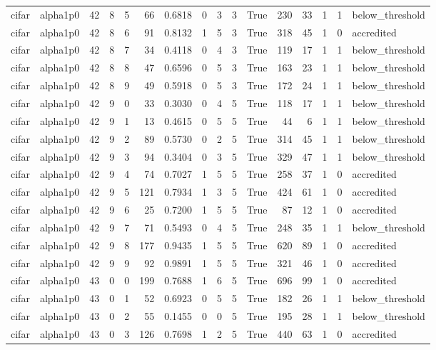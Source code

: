 \begin{tabular}{llrrrrrrrrrrrrrl}
cifar & alpha1p0 & 42 & 8 & 5 & 66 & 0.6818 & 0 & 3 & 3 & True & 230 & 33 & 1 & 1 & below\_threshold \\
cifar & alpha1p0 & 42 & 8 & 6 & 91 & 0.8132 & 1 & 5 & 3 & True & 318 & 45 & 1 & 0 & accredited \\
cifar & alpha1p0 & 42 & 8 & 7 & 34 & 0.4118 & 0 & 4 & 3 & True & 119 & 17 & 1 & 1 & below\_threshold \\
cifar & alpha1p0 & 42 & 8 & 8 & 47 & 0.6596 & 0 & 5 & 3 & True & 163 & 23 & 1 & 1 & below\_threshold \\
cifar & alpha1p0 & 42 & 8 & 9 & 49 & 0.5918 & 0 & 5 & 3 & True & 172 & 24 & 1 & 1 & below\_threshold \\
cifar & alpha1p0 & 42 & 9 & 0 & 33 & 0.3030 & 0 & 4 & 5 & True & 118 & 17 & 1 & 1 & below\_threshold \\
cifar & alpha1p0 & 42 & 9 & 1 & 13 & 0.4615 & 0 & 5 & 5 & True & 44 & 6 & 1 & 1 & below\_threshold \\
cifar & alpha1p0 & 42 & 9 & 2 & 89 & 0.5730 & 0 & 2 & 5 & True & 314 & 45 & 1 & 1 & below\_threshold \\
cifar & alpha1p0 & 42 & 9 & 3 & 94 & 0.3404 & 0 & 3 & 5 & True & 329 & 47 & 1 & 1 & below\_threshold \\
cifar & alpha1p0 & 42 & 9 & 4 & 74 & 0.7027 & 1 & 5 & 5 & True & 258 & 37 & 1 & 0 & accredited \\
cifar & alpha1p0 & 42 & 9 & 5 & 121 & 0.7934 & 1 & 3 & 5 & True & 424 & 61 & 1 & 0 & accredited \\
cifar & alpha1p0 & 42 & 9 & 6 & 25 & 0.7200 & 1 & 5 & 5 & True & 87 & 12 & 1 & 0 & accredited \\
cifar & alpha1p0 & 42 & 9 & 7 & 71 & 0.5493 & 0 & 4 & 5 & True & 248 & 35 & 1 & 1 & below\_threshold \\
cifar & alpha1p0 & 42 & 9 & 8 & 177 & 0.9435 & 1 & 5 & 5 & True & 620 & 89 & 1 & 0 & accredited \\
cifar & alpha1p0 & 42 & 9 & 9 & 92 & 0.9891 & 1 & 5 & 5 & True & 321 & 46 & 1 & 0 & accredited \\
cifar & alpha1p0 & 43 & 0 & 0 & 199 & 0.7688 & 1 & 6 & 5 & True & 696 & 99 & 1 & 0 & accredited \\
cifar & alpha1p0 & 43 & 0 & 1 & 52 & 0.6923 & 0 & 5 & 5 & True & 182 & 26 & 1 & 1 & below\_threshold \\
cifar & alpha1p0 & 43 & 0 & 2 & 55 & 0.1455 & 0 & 0 & 5 & True & 195 & 28 & 1 & 1 & below\_threshold \\
cifar & alpha1p0 & 43 & 0 & 3 & 126 & 0.7698 & 1 & 2 & 5 & True & 440 & 63 & 1 & 0 & accredited \\

\end{tabular}
